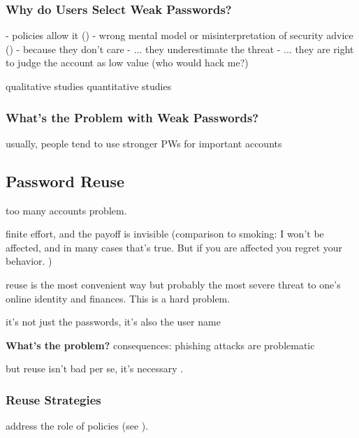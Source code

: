 		\subsubsection{Why do Users Select Weak Passwords?}
	
	- policies allow it (\cite{Seitz2017PoliciesReuse})
	- wrong mental model or misinterpretation of security advice (\cite{Ur2015PWCreationLab, Ur2016PerceptionsPassword, Seitz2017PASDJO})
	- because they don't care
	- ... they underestimate the threat
	- ... they are right to judge the account as low value (who would hack me?) \cite{LastPass2016PersonalitiesGetUsHacked}
	
	
	qualitative studies \cite{Ur2015PWCreationLab, Stobert2014PasswordLifeCycle} 
	quantitative studies \cite{Ur2016PerceptionsPassword, Seitz2017PASDJO}
	
	\subsubsection{What's the Problem with Weak Passwords?}
	usually, people tend to use stronger PWs for important accounts

	


	\subsection{Password Reuse}
	too many accounts problem. 
	
	finite effort, and the payoff is invisible (comparison to smoking: I won't be affected, and in many cases that's true. But if you are affected you regret your behavior. )
	
	reuse is the most convenient way but probably the most severe threat to one's online identity and finances. This is a hard problem. 
	
	it's not just the passwords, it's also the user name 
	
	
	\textbf{What's the problem?}
	consequences: phishing attacks are problematic
	
	but reuse isn't bad per se, it's necessary \cite{Florencio2014PasswordPortfoliosFiniteUser, ZhangKennedy2016RevisitingPasswordRules}. 
	
	
	
	
	\subsubsection{Reuse Strategies}
	address the role of policies (see \cite{Seitz2017PoliciesReuse}).
	
